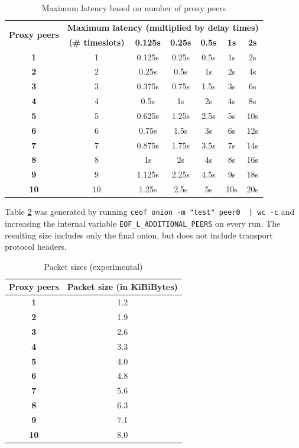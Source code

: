\begin{longtable}{|c|c|c|c|c|c|c|}
\caption{Maximum latency based on number of proxy peers}
\label{maxlatencypeers}\\
\hline
\multirow{2}{*}{\textbf{Proxy peers}} & \multicolumn{6}{|l|}{\textbf{Maximum latency (multiplied by delay times)}} \\
& \textbf{(\# timeslots)} & \textbf{0.125s} & \textbf{0.25s} & \textbf{0.5s} & \textbf{1s} & \textbf{2s}\\
\hline
\textbf{1} & 1 & 0.125s & 0.25s & 0.5s & 1s & 2s\\
\hline
\textbf{2} & 2 & 0.25s & 0.5s & 1s & 2s & 4s\\
\hline
\textbf{3} & 3 & 0.375s & 0.75s & 1.5s & 3s & 6s\\
\hline
\textbf{4} & 4 & 0.5s & 1s & 2s & 4s & 8s\\
\hline
\textbf{5} & 5 & 0.625s & 1.25s & 2.5s & 5s & 10s\\
\hline
\textbf{6} & 6 & 0.75s & 1.5s & 3s & 6s & 12s\\
\hline
\textbf{7} & 7 & 0.875s & 1.75s & 3.5s & 7s & 14s\\
\hline
\textbf{8} & 8 & 1s & 2s & 4s & 8s & 16s\\
\hline
\textbf{9} & 9 & 1.125s & 2.25s & 4.5s & 9s & 18s\\
\hline
\textbf{10} & 10 & 1.25s & 2.5s & 5s & 10s & 20s\\
\hline
\end{longtable}

Table \ref{pkgsizes} was generated by running
\verb=ceof onion -m "test" peer0  | wc -c=
and increasing the internal variable \verb=EOF_L_ADDITIONAL_PEERS=
on every run. The resulting size includes only the final onion,
but does not include transport protocol headers.
\begin{longtable}{|c|c|}
\caption{Packet sizes (experimental)}
\label{pkgsizes}\\
\hline
\textbf{Proxy peers} & \textbf{Packet size (in KiBiBytes)}\\
\hline
\textbf{1} & 1.2\\
\hline
\textbf{2} & 1.9\\
\hline
\textbf{3} & 2.6\\
\hline
\textbf{4} & 3.3\\
\hline
\textbf{5} & 4.0\\
\hline
\textbf{6} & 4.8\\
\hline
\textbf{7} & 5.6\\
\hline
\textbf{8} & 6.3\\
\hline
\textbf{9} & 7.1\\
\hline
\textbf{10} & 8.0\\
\hline
\end{longtable}


